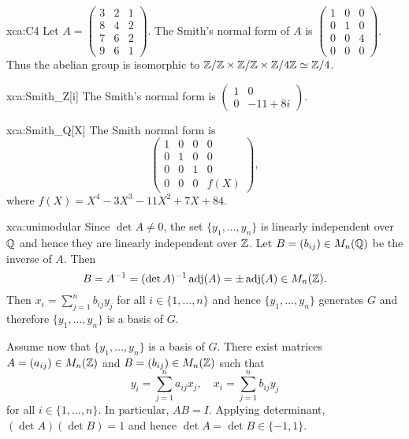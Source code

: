 \begin{sol}{xca:C4}
    Let $A=\begin{pmatrix}
    3 & 2 & 1 \\
    8 & 4 & 2 \\
    7 & 6 & 2\\
    9 & 6 & 1
    \end{pmatrix}$.  
    The Smith's normal form of $A$  
    is $\begin{pmatrix}
        1 & 0 & 0 \\
        0 & 1 & 0 \\
        0 & 0 & 4 \\
        0 & 0 & 0
    \end{pmatrix}$. Thus the abelian group is isomorphic to $\mathbb{Z}/\mathbb{Z}\times\mathbb{Z}/\mathbb{Z}\times\mathbb{Z}/4\mathbb{Z}\simeq\mathbb{Z}/4$.  
\end{sol}

\begin{sol}{xca:Smith_Z[i]}
	The Smith's normal form is $\begin{pmatrix}
		1 & 0\\
		0 & -11+8i
	\end{pmatrix}$. 
\end{sol}

\begin{sol}{xca:Smith_Q[X]}
	The Smith normal form is 
	\[
		\begin{pmatrix}
			1 & 0 & 0 & 0 \\
			0 & 1 & 0 & 0 \\
			0 & 0 & 1 & 0 \\
			0 & 0 & 0 & f(X)
		\end{pmatrix},
	\]
	where $f(X)=X^4 - 3 X^3 - 11 X^2 + 7X + 84$. 
\end{sol}

\begin{sol}{xca:unimodular}
    Since $\det A\ne 0$, the set $\{y_1,\dots,y_n\}$ is linearly independent over $\mathbb{Q}$
    and hence they are linearly independent over $\mathbb{Z}$. 
    Let $B=(b_{ij})\in M_n(\mathbb{Q})$ be the inverse of $A$. Then 
    \[
    B=A^{-1}=(\det A)^{-1}\operatorname{adj}(A)=\pm\operatorname{adj}(A)\in M_n(\mathbb{Z}).
    \]
    Then $x_i=\sum_{j=1}^n b_{ij}y_j$ for all $i\in\{1,\dots,n\}$ 
    and hence $\{y_1,\dots,y_n\}$ generates $G$ and therefore 
    $\{y_1,\dots,y_n\}$ is a basis of $G$. 
    
    Assume now that $\{y_1,\dots,y_n\}$ is a basis of $G$. There exist matrices 
    $A=(a_{ij})\in M_n(\mathbb{Z})$ and $B=(b_{ij})\in M_n(\mathbb{Z})$ such that
    \[
    y_i=\sum_{j=1}^{n}a_{ij}x_j,\quad
    x_i=\sum_{j=1}^{n}b_{ij}y_j
    \]
    for all $i\in\{1,\dots,n\}$. In particular, 
    $AB=I$. Applying determinant, $(\det A)(\det B)=1$ and hence $\det A=\det B\in\{-1,1\}$. 
\end{sol}

    
